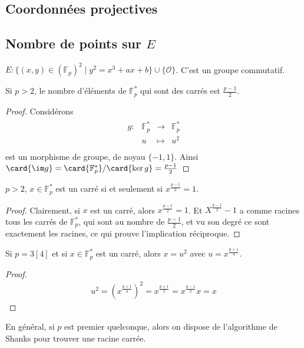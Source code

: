         \subsection{Coordonnées projectives}

        \subsection{Nombre de points sur $E$}
            $E : \{(x,y) \in (\mathbb{F}_p)^2 \mid y^2 = x^3 + ax + b\} \cup \{\mathcal{O}\}$. C'est un groupe commutatif.
            \begin{prop}
                Si $p > 2$, le nombre d'éléments de $\mathbb{F}_p^*$ qui sont des carrés est $\frac {p-1}2$.
            \end{prop}
            \begin{proof}
                Considérons
                \begin{align*}
                    \begin{array}{cccc}
                        g : & \mathbb{F}_p^* & \to & \mathbb{F}_p^* \\
                        & u & \mapsto & u^2 \\
                    \end{array}
                \end{align*}
                est un morphisme de groupe, de noyau $\{-1, 1\}$. Ainsi $\card{\im g} = \card{\mathbb{F}_p^*} / \card{\ker g} = \frac{p - 1}2$
            \end{proof}
            \begin{prop}
                $p > 2$, $x \in \mathbb{F}_p^*$ est un carré si et seulement si $x^{\frac{p - 1}2} = 1$.
            \end{prop}
            \begin{proof}
                Clairement, si $x$ est un carré, alors $x^{\frac{p - 1}2} = 1$. Et $X^{\frac{p - 1}2} - 1$ a comme racines tous les carrés de $\mathbb{F}_p^*$, qui sont au nombre de $\frac{p - 1}2$, et vu son degré ce sont exactement les racines, ce qui prouve l'implication réciproque.
            \end{proof}
            \begin{prop}
                Si $p = 3 [4]$ et si $x \in \mathbb{F}_p^*$ est un carré, alors $x = u^2$ avec $u = x^{\frac{p + 1}4}$.
            \end{prop}
            \begin{proof}
                \begin{align*}
                    u^2 = \left( x^{\frac{p + 1}4} \right)^2 = x^{\frac{p + 1}2} = x^{\frac{p - 1}2} x = x
                \end{align*}
            \end{proof}
            \begin{remq}
                En général, si $p$ est premier quelconque, alors on dispose de l'algorithme de Shanks pour trouver une racine carrée.
            \end{remq}

